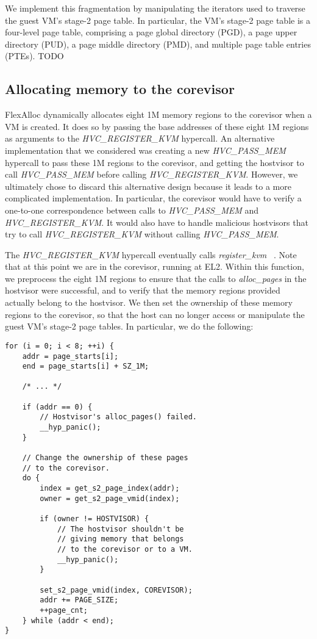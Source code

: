 We implement this fragmentation by manipulating the iterators used to traverse
the guest VM's stage-2 page table. In particular, the VM's stage-2 page table
is a four-level page table, comprising a page global directory (PGD), a
page upper directory (PUD), a page middle directory (PMD), and multiple page table
entries (PTEs). TODO

\subsection{Allocating memory to the corevisor}

FlexAlloc dynamically allocates eight 1M memory regions to the corevisor when a
VM is created. It does so by passing the base addresses of these eight 1M
regions as arguments to the \textit{HVC\_REGISTER\_KVM} hypercall. An alternative
implementation that we considered was creating a new \textit{HVC\_PASS\_MEM} hypercall to pass these
1M regions to the corevisor, and getting the hostvisor to call \textit{HVC\_PASS\_MEM}
before calling \textit{HVC\_REGISTER\_KVM}. However, we ultimately chose to
discard this alternative design because it leads to a more complicated
implementation. In particular, the corevisor would have to verify a one-to-one
correspondence between calls to \textit{HVC\_PASS\_MEM} and \textit{HVC\_REGISTER\_KVM}.
It would also have to handle malicious hostvisors that try to call 
\textit{HVC\_REGISTER\_KVM} without calling \textit{HVC\_PASS\_MEM}.

The \textit{HVC\_REGISTER\_KVM} hypercall eventually calls \textit{register\_kvm}
~\cite{el2.c}. Note that at this point we are in the corevisor, running at EL2.
Within this function, we preprocess the eight 1M regions to ensure that the
calls to \textit{alloc\_pages} in the hostvisor were successful, and to verify
that the memory regions provided actually belong to the hostvisor. We then set
the ownership of these memory regions to the corevisor, so that the host can
no longer access or manipulate the guest VM's stage-2 page tables. In particular,
we do the following:

\begin{verbatim}
for (i = 0; i < 8; ++i) {
    addr = page_starts[i];
    end = page_starts[i] + SZ_1M;
    
    /* ... */
    
    if (addr == 0) {
        // Hostvisor's alloc_pages() failed.
        __hyp_panic();
    }

    // Change the ownership of these pages
    // to the corevisor.
    do {
        index = get_s2_page_index(addr);
        owner = get_s2_page_vmid(index);

        if (owner != HOSTVISOR) {
            // The hostvisor shouldn't be
            // giving memory that belongs
            // to the corevisor or to a VM.
            __hyp_panic();
        }

        set_s2_page_vmid(index, COREVISOR);
        addr += PAGE_SIZE;
        ++page_cnt;
    } while (addr < end);
}
\end{verbatim}

